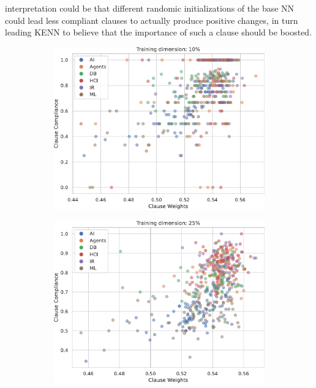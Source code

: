 \begin{definition}
interpretation could be that different randomic initializations of the base NN could lead less compliant clauses to actually produce positive changes, in turn leading KENN to believe that the importance of such a clause should be boosted.
\end{definition}

\begin{figure}
	\centering
	\begin{subfigure}{.5\textwidth}
		\centering
		\includegraphics[width=0.95\linewidth]{figures/scatter_10.pdf}
		\label{fig:aa}
	\end{subfigure}%
	\begin{subfigure}{.5\textwidth}
		\centering
		\includegraphics[width=0.95\linewidth]{figures/scatter_25.pdf}

\end{subfigure}
\end{figure}
